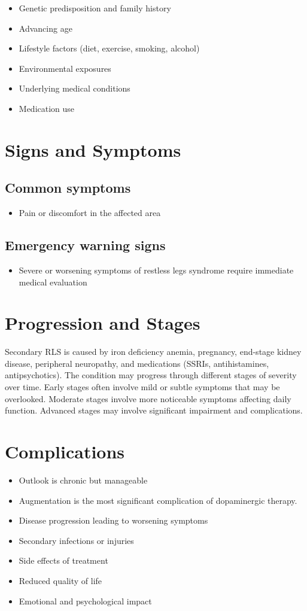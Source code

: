 \begin{itemize}[noitemsep]
  \item Genetic predisposition and family history
  \item Advancing age
  \item Lifestyle factors (diet, exercise, smoking, alcohol)
  \item Environmental exposures
  \item Underlying medical conditions
  \item Medication use
\end{itemize}
\section{Signs and Symptoms}

\subsection{Common symptoms}
\begin{itemize}[noitemsep]
  \item Pain or discomfort in the affected area
  \end{itemize}

\subsection{Emergency warning signs}
\begin{itemize}[noitemsep]
  \item Severe or worsening symptoms of restless legs syndrome require immediate medical evaluation
\end{itemize}
\section{Progression and Stages}
Secondary RLS is caused by iron deficiency anemia, pregnancy, end-stage kidney disease, peripheral neuropathy, and medications (SSRIs, antihistamines, antipsychotics). The condition may progress through different stages of severity over time. Early stages often involve mild or subtle symptoms that may be overlooked. Moderate stages involve more noticeable symptoms affecting daily function. Advanced stages may involve significant impairment and complications.
\section{Complications}
\begin{itemize}[noitemsep]
  \item Outlook is chronic but manageable
  \item Augmentation is the most significant complication of dopaminergic therapy.
  \item Disease progression leading to worsening symptoms
  \item Secondary infections or injuries
  \item Side effects of treatment
  \item Reduced quality of life
  \item Emotional and psychological impact
\end{itemize}
